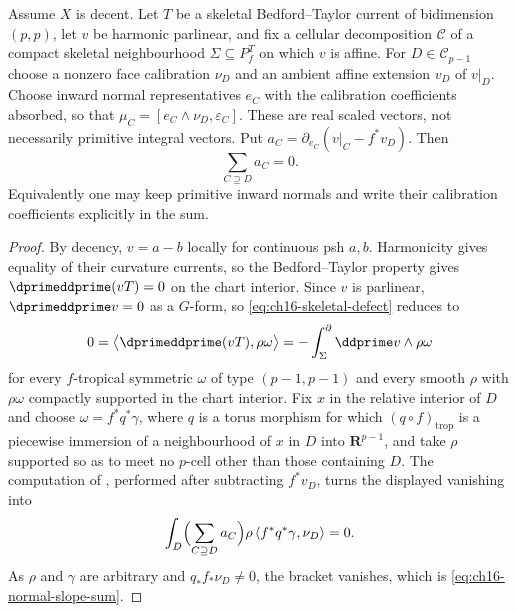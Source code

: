 \begin{lemma}
\label{lem:ch16-normal-slope-vanishes}
Assume $X$ is decent.  Let $T$ be a skeletal Bedford--Taylor current
of bidimension $(p,p)$, let $v$ be harmonic parlinear, and fix a cellular
decomposition $\mathscr C$ of a compact skeletal neighbourhood
$\Sigma\subseteq P^T_f$ on which $v$ is affine.  For
$D\in\mathscr C_{p-1}$ choose a nonzero face calibration $\nu_D$ and an
ambient affine extension $v_D$ of $v|_D$.  Choose inward normal
representatives $e_C$ with the calibration coefficients absorbed, so that
$\mu_C=[e_C\wedge\nu_D,\varepsilon_C]$.  These are real scaled vectors,
not necessarily primitive integral vectors.  Put
$a_C=\partial_{e_C}(v|_C-f^*v_D)$.  Then
\begin{equation}
\label{eq:ch16-normal-slope-sum}
                 \sum_{C\supseteq D}a_C=0.
\end{equation}
Equivalently one may keep primitive inward normals and write their
calibration coefficients explicitly in the sum.
\end{lemma}

\begin{proof}
By decency, $v=a-b$ locally for continuous psh $a,b$.  Harmonicity
gives equality of their curvature currents, so the Bedford--Taylor property
gives $\dprimeddprime(vT)=0$ on the chart interior.  Since $v$ is parlinear, $\dprimeddprime v=0$ as a $G$-form,
so \eqref{eq:ch16-skeletal-defect} reduces to
\[
 0=\bigl\langle\dprimeddprime(vT),\rho\omega\bigr\rangle
 =-\int^\partial_\Sigma\ddprime v\wedge\rho\omega
\]
for every $f$-tropical symmetric $\omega$ of type $(p-1,p-1)$ and every
smooth $\rho$ with $\rho\omega$ compactly supported in the chart interior.
Fix $x$ in the relative interior of $D$ and choose $\omega=f^*q^*\gamma$,
where $q$ is a torus morphism for which $(q\circ f)_{\mathrm{trop}}$ is a
piecewise immersion of a neighbourhood of $x$ in $D$ into $\mathbf R^{p-1}$,
and take $\rho$ supported so as to meet no $p$-cell other than those
containing $D$.  The computation of
, performed after subtracting $f^*v_D$,
turns the displayed vanishing into
\[
 \int_D\Bigl(\sum_{C\supseteq D}a_C\Bigr)
   \rho\,\langle f^*q^*\gamma,\nu_D\rangle=0 .
\]
As $\rho$ and $\gamma$ are arbitrary and $q_*f_*\nu_D\neq0$, the bracket
vanishes, which is \eqref{eq:ch16-normal-slope-sum}.
\end{proof}

